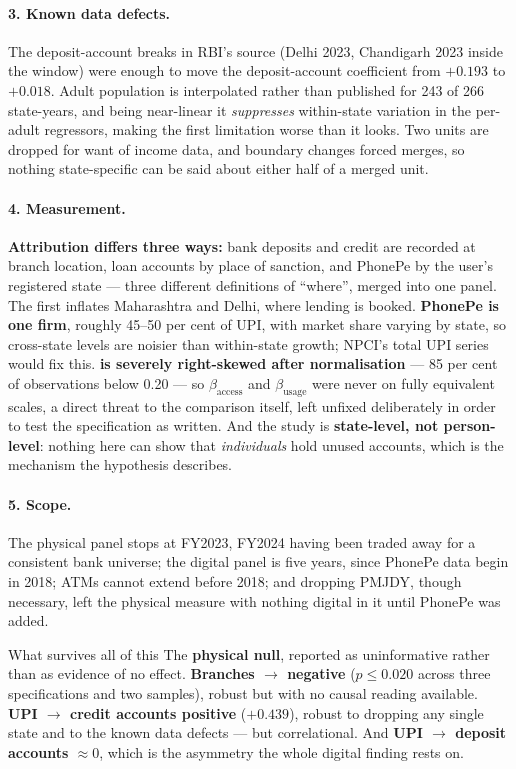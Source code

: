 \paragraph{3. Known data defects.} The deposit-account breaks in RBI's source (Delhi 2023,
Chandigarh 2023 inside the window) were enough to move the deposit-account coefficient from
$+0.193$ to $+0.018$. Adult population is interpolated rather than published for 243 of 266
state-years, and being near-linear it \emph{suppresses} within-state variation in the per-adult
regressors, making the first limitation worse than it looks. Two units are dropped for want of
income data, and boundary changes forced merges, so nothing state-specific can be said about
either half of a merged unit.

\paragraph{4. Measurement.} \textbf{Attribution differs three ways:} bank deposits and credit are
recorded at branch location, loan accounts by place of sanction, and PhonePe by the user's
registered state --- three different definitions of ``where'', merged into one panel. The first
inflates Maharashtra and Delhi, where lending is booked. \textbf{PhonePe is one firm}, roughly
45--50 per cent of UPI, with market share varying by state, so cross-state levels are noisier than
within-state growth; NPCI's total UPI series would fix this. \textbf{\Usage{} is severely
right-skewed after normalisation} --- 85 per cent of observations below 0.20 --- so
$\beta_{\text{access}}$ and $\beta_{\text{usage}}$ were never on fully equivalent scales, a direct
threat to the comparison itself, left unfixed deliberately in order to test the specification as
written. And the study is \textbf{state-level, not person-level}: nothing here can show that
\emph{individuals} hold unused accounts, which is the mechanism the hypothesis describes.

\paragraph{5. Scope.} The physical panel stops at FY2023, FY2024 having been traded away for a
consistent bank universe; the digital panel is five years, since PhonePe data begin in 2018; ATMs
cannot extend before 2018; and dropping PMJDY, though necessary, left the physical measure with
nothing digital in it until PhonePe was added.

\begin{keybox}{What survives all of this}
The \textbf{physical null}, reported as uninformative rather than as evidence of no effect.
\textbf{Branches $\to$ \Usage{} negative} ($p \leq 0.020$ across three specifications and two
samples), robust but with no causal reading available. \textbf{UPI $\to$ credit accounts positive}
($+0.439$), robust to dropping any single state and to the known data defects --- but
correlational. And \textbf{UPI $\to$ deposit accounts $\approx 0$}, which is the asymmetry the whole
digital finding rests on.
\end{keybox}
